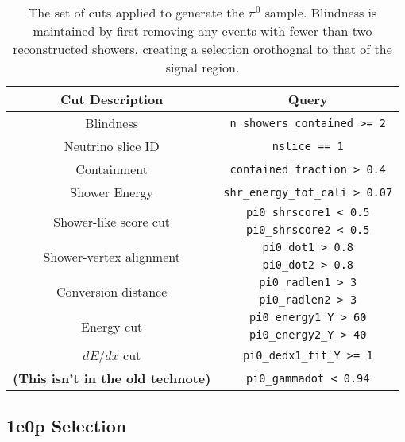 \renewcommand{\arraystretch}{1.4}
\begin{table}[H]
    \centering
    \begin{tabular}{c|c}
        \hline
        Cut Description & Query \\
        \hline
        \hline
        Blindness & \verb|n_showers_contained >= 2| \\
        \hline
        Neutrino slice ID & \verb|nslice == 1| \\
        \hline
        Containment & \verb|contained_fraction > 0.4| \\
        \hline
        Shower Energy & \verb|shr_energy_tot_cali > 0.07| \\
        \hline
        \multirow{2}{*}{Shower-like score cut} & \verb|pi0_shrscore1 < 0.5| \\
         & \verb|pi0_shrscore2 < 0.5| \\
        \hline
        \multirow{2}{*}{Shower-vertex alignment} & \verb|pi0_dot1 > 0.8| \\
        & \verb|pi0_dot2 > 0.8| \\
        \hline
        \multirow{2}{*}{Conversion distance} & \verb|pi0_radlen1 > 3| \\
        & \verb|pi0_radlen2 > 3| \\
        \hline
        \multirow{2}{*}{Energy cut} & \verb|pi0_energy1_Y > 60| \\
        & \verb|pi0_energy2_Y > 40| \\
        \hline
        $dE/dx$ cut & \verb|pi0_dedx1_fit_Y >= 1| \\
        \hline
        {\bf (This isn't in the old technote)} & \verb|pi0_gammadot < 0.94| \\
         \hline
    \end{tabular}
    \caption{The set of cuts applied to generate the $\pi^0$ sample. Blindness is maintained by first removing any events with fewer than two reconstructed showers, creating a selection orothognal to that of the signal region.}
    \label{tab:Pi0Selection}
\end{table}
\renewcommand{\arraystretch}{1.0}

\subsection{1e0p Selection}
\label{appendix:1e0pSelection}

